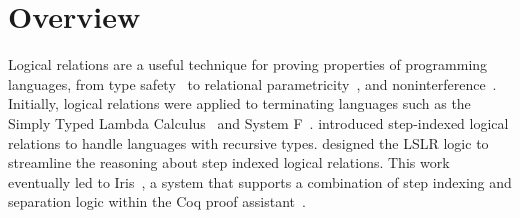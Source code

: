 \documentclass[acmsmall]{acmart}
\begin{document}




\maketitle


\clearpage

\tableofcontents

\section{Overview}
\label{sec:intro}

Logical relations are a useful technique for proving properties of
programming languages, from type safety~\citep{Timany:2022aa} to
relational parametricity~\citep{REYNOLDS83}, and
noninterference~\citep{heintze1998slam}.  Initially, logical relations
were applied to terminating languages such as the Simply Typed Lambda
Calculus~\citep{Tait:1967aa} and System F~\citep{GIRARD72}.
\citet{Appel:2001aa} introduced step-indexed logical relations to
handle languages with recursive types.  \citet{Dreyer:2011wl} designed
the LSLR logic to streamline the reasoning about step indexed logical
relations.  This work eventually led to Iris~\citep{JUNG:2018aa}, a
system that supports a combination of step indexing and separation
logic within the Coq proof
assistant~\citep{The-Coq-Development-Team:2004kf,Huet:2016aa}.
\end{document}
